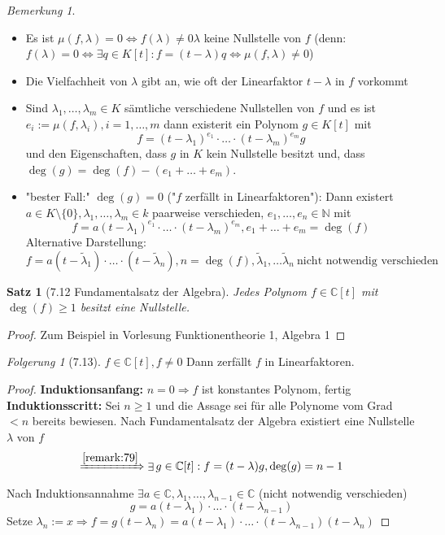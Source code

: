 \documentclass[a4paper]{scrartcl}
\DeclareMathOperator{\Exists}{\exists}
\theoremstyle{definition}
\theoremstyle{plain}
\newtheorem{thm}{Satz}
\theoremstyle{plain}
\theoremstyle{remark}
\newtheorem{remark}{Bemerkung}
\theoremstyle{remark}
\newtheorem{conc}{Folgerung}
\theoremstyle{remark}
\begin{document}
\begin{remark}
\begin{itemize}
\item Es ist $\mu(f,\lambda) = 0 \Leftrightarrow f(\lambda) \neq 0 \lambda$ keine Nullstelle von $f$ (denn: $f(\lambda) = 0 \Leftrightarrow \Exists q\in K[t]: f=(t - \lambda)q \Leftrightarrow \mu(f,\lambda) \neq 0$)
\item Die Vielfachheit von $\lambda$ gibt an, wie oft der Linearfaktor $t - \lambda$ in $f$ vorkommt
\item Sind $\lambda_1,\ldots,\lambda_m \in K$ sämtliche verschiedene Nullstellen von $f$ und es ist $e_i := \mu(f,\lambda_i),i = 1,\ldots,m$ dann existerit ein Polynom $g\in K[t]$ mit
\[f = (t - \lambda_1)^{e_1}\cdot\ldots\cdot(t-\lambda_m)^{e_m}g\]
und den Eigenschaften, dass $g$ in $K$ kein Nullstelle besitzt und, dass $\deg(g) = \deg(f) - (e_1 + \ldots + e_m)$.
\item "bester Fall:" $\deg(g) = 0$ ("$f$ zerfällt in Linearfaktoren"):
Dann existert $a\in K\setminus\{0\}, \lambda_1,\ldots, \lambda_m \in k$ paarweise verschieden, $e_1,\ldots,e_n \in \mathbb{N}$  mit
\[f = a(t - \lambda_1)^{e_1}\cdot\ldots\cdot(t - \lambda_m)^{e_m}, e_1 + \ldots + e_m = \deg(f)\]
Alternative Darstellung:
\[f = a(t - \tilde\lambda_1) \cdot \ldots\cdot(t - \tilde\lambda_n), n = \deg(f), \tilde\lambda_1,\ldots\tilde\lambda_n~\text{nicht notwendig verschieden}\]
\end{itemize}
\end{remark}
\begin{thm}[7.12 Fundamentalsatz der Algebra]
Jedes Polynom $f \in \mathbb{C}[t]$ mit $\deg(f) \geq 1$ besitzt eine Nullstelle.
\end{thm}
\begin{proof}
Zum Beispiel in Vorlesung Funktionentheorie 1, Algebra 1
\end{proof}
\begin{conc}[7.13]
$f\in\mathbb{C}[t], f\neq 0$
Dann zerfällt $f$ in Linearfaktoren.
\end{conc}
\begin{proof}
\textbf{Induktionsanfang:} $n = 0 \Rightarrow f$ ist konstantes Polynom, fertig \\
  \textbf{Induktionsscritt:} Sei $n\geq 1$ und die Assage sei für alle Polynome vom Grad $< n$ bereits bewiesen. Nach Fundamentalsatz der Algebra existiert eine Nullstelle $\lambda$ von $f$
\[\xRightarrow{\ref{remark:79}} \Exists g\in \mathbb{C}[t]: f = (t - \lambda)g, \deg(g) = n - 1 \]
Nach Induktionsannahme $\Exists a\in\mathbb{C},\lambda_1,\ldots,\lambda_{n - 1} \in \mathbb{C}$ (nicht notwendig verschieden)
\[g = a(t - \lambda_1)\cdot\ldots\cdot(t - \lambda_{n-1})\]
Setze $\lambda_n := x \Rightarrow f = g(t - \lambda_n) = a(t - \lambda_1)\cdot\ldots\cdot(t - \lambda_{n - 1})(t - \lambda_n)$
\end{proof}
\end{document}
